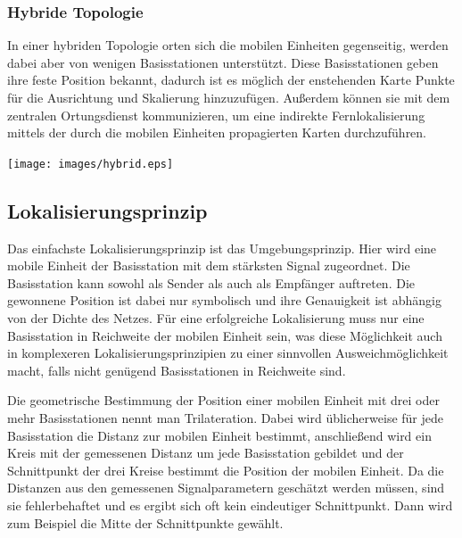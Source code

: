 \subsubsection{Hybride Topologie}
	\begin{minipage}{\textwidth}
		\begin{minipage}[c][6cm][t]{0.6\textwidth\relax}
			In einer hybriden Topologie orten sich die mobilen Einheiten gegenseitig, werden dabei aber von wenigen Basisstationen unterstützt.
			Diese Basisstationen geben ihre feste Position bekannt, dadurch ist es möglich der enstehenden Karte Punkte für die Ausrichtung und Skalierung hinzuzufügen.
			Außerdem können sie mit dem zentralen Ortungsdienst kommunizieren, um eine indirekte Fernlokalisierung mittels der durch die mobilen Einheiten propagierten Karten durchzuführen.
		\end{minipage}\hfill
		\begin{minipage}[c][6cm][c]{0.4\textwidth\relax}
			\centering
			\texttt{[image: images/hybrid.eps]}
		\end{minipage}
	\end{minipage}


\subsection{Lokalisierungsprinzip}
Das einfachste Lokalisierungsprinzip ist das Umgebungsprinzip.
Hier wird eine mobile Einheit der Basisstation mit dem stärksten Signal zugeordnet.
Die Basisstation kann sowohl als Sender als auch als Empfänger auftreten.
Die gewonnene Position ist dabei nur symbolisch und ihre Genauigkeit ist abhängig von der Dichte des Netzes.
Für eine erfolgreiche Lokalisierung muss nur eine Basisstation in Reichweite der mobilen Einheit sein, was diese Möglichkeit auch in komplexeren Lokalisierungsprinzipien zu einer sinnvollen Ausweichmöglichkeit macht, falls nicht genügend Basisstationen in Reichweite sind.

Die geometrische Bestimmung der Position einer mobilen Einheit mit drei oder mehr Basisstationen nennt man Trilateration. Dabei wird üblicherweise für jede Basisstation die Distanz zur mobilen Einheit bestimmt, anschließend wird ein Kreis mit der gemessenen Distanz um jede Basisstation gebildet und der Schnittpunkt der drei Kreise bestimmt die Position der mobilen Einheit. Da die Distanzen aus den gemessenen Signalparametern geschätzt werden müssen, sind sie fehlerbehaftet und es ergibt sich oft kein eindeutiger Schnittpunkt.
Dann wird zum Beispiel die Mitte der Schnittpunkte gewählt.

